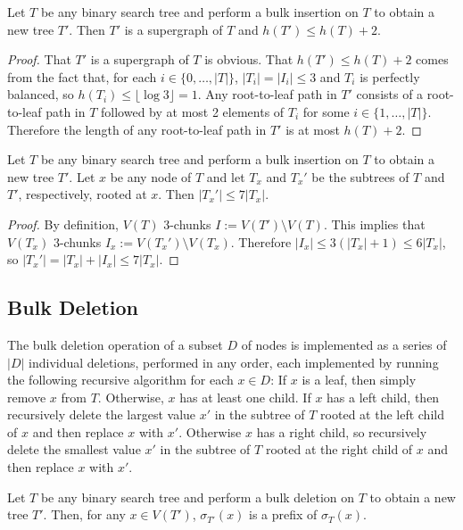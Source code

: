 \documentclass[kpfonts]{patmorin}
\let\le\leqslant
\begin{document}
\begin{lem}
  Let $T$ be any binary search tree and perform a bulk insertion on $T$ to obtain a new tree $T'$.  Then $T'$ is a supergraph of $T$ and $h(T')\le h(T)+2$.
\end{lem}

\begin{proof}
  That $T'$ is a supergraph of $T$ is obvious.  That $h(T')\le h(T)+2$ comes from the fact that, for each $i\in\{0,\ldots,|T|\}$, $|T_i|=|I_i|\le 3$ and $T_i$ is perfectly balanced, so $h(T_i)\le\lfloor\log 3\rfloor = 1$. Any root-to-leaf path in $T'$ consists of a root-to-leaf path in $T$ followed by at most 2 elements of $T_i$ for some $i\in\{1,\ldots,|T|\}$.  Therefore the length of any root-to-leaf path in $T'$ is at most $h(T)+2$.
\end{proof}

\begin{lem}
  Let $T$ be any binary search tree and perform a bulk insertion on $T$ to obtain a new tree $T'$.  Let $x$ be any node of $T$ and let $T_x$ and $T_x'$ be the subtrees of $T$ and $T'$, respectively, rooted at $x$.  Then $|T_x'|\le 7|T_x|$.
\end{lem}

\begin{proof}
  By definition, $V(T)$ 3-chunks $I:=V(T')\setminus V(T)$.  This implies that $V(T_x)$ 3-chunks $I_x:=V(T_x')\setminus V(T_x)$.  Therefore $|I_x|\le 3(|T_x|+1)\le 6|T_x|$, so $|T_x'|=|T_x|+|I_x|\le 7|T_x|$.
\end{proof}


\subsection{Bulk Deletion}

The bulk deletion operation of a subset $D$ of nodes is implemented as a series of $|D|$ individual deletions, performed in any order, each implemented by running the following recursive algorithm for each $x\in D$:  If $x$ is a leaf, then simply remove $x$ from $T$.  Otherwise, $x$ has at least one child.  If $x$ has a left child, then recursively delete the largest value $x'$ in the subtree of $T$ rooted at the left child of $x$ and then replace $x$ with $x'$.  Otherwise $x$ has a right child, so recursively delete the smallest value $x'$ in the subtree of $T$ rooted at the right child of $x$ and then replace $x$ with $x'$.


\begin{lem}
  Let $T$ be any binary search tree and perform a bulk deletion on $T$ to obtain a new tree $T'$.  Then, for any $x\in V(T')$, $\sigma_{T'}(x)$ is a prefix of $\sigma_T(x)$.
\end{lem}
\end{document}
